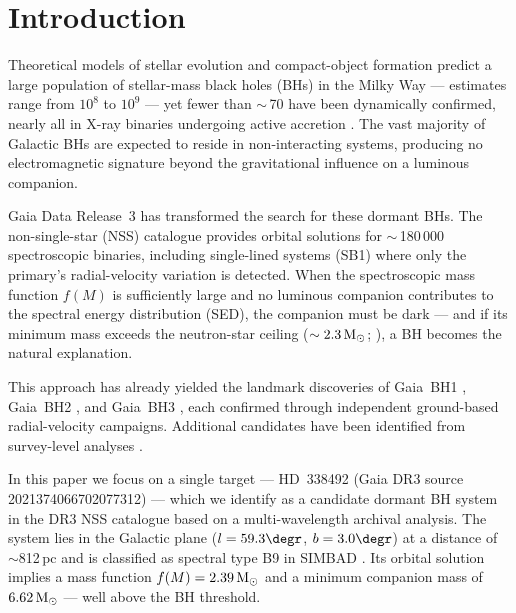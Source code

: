 \documentclass[usenatbib,fleqn]{mnras}
\newcommand{\Msun}{{\rm M}_\odot}
\newcommand{\fmass}{f(M)}
\begin{document}
\section{Introduction}
\label{sec:intro}

Theoretical models of stellar evolution and compact-object formation
predict a large population of stellar-mass black holes (BHs) in the
Milky Way --- estimates range from $10^8$ to $10^9$
\citep{AgolKamionkowski2002, Shapiro1983} --- yet fewer than
$\sim$\,70 have been dynamically confirmed, nearly all in X-ray
binaries undergoing active accretion
\citep{RemillardMcClintock2006}.  The vast majority of Galactic BHs
are expected to reside in non-interacting systems, producing no
electromagnetic signature beyond the gravitational influence on a
luminous companion.

Gaia Data Release~3 \citep[DR3;][]{GaiaCollaboration2023} has
transformed the search for these dormant BHs.  The non-single-star
(NSS) catalogue \citep{GaiaNSS2023} provides orbital solutions for
$\sim$\,180\,000 spectroscopic binaries, including single-lined
systems (SB1) where only the primary's radial-velocity variation is
detected.  When the spectroscopic mass function $\fmass$ is
sufficiently large and no luminous companion contributes to the
spectral energy distribution (SED), the companion must be dark ---
and if its minimum mass exceeds the neutron-star ceiling
($\sim 2.3\,\Msun$; \citealt{Rezzolla2018}), a BH becomes the
natural explanation.

This approach has already yielded the landmark discoveries of
Gaia~BH1 \citep{ElBadry2023a}, Gaia~BH2 \citep{ElBadry2023b}, and
Gaia~BH3 \citep{GaiaBH3_2024}, each confirmed through independent
ground-based radial-velocity campaigns.  Additional candidates have
been identified from survey-level analyses
\citep{Jayasinghe2021, Thompson2019, Shenar2022, Mahy2022}.

In this paper we focus on a single target --- HD~338492 (Gaia DR3
source 2021374066702077312) --- which we identify as a candidate
dormant BH system in the DR3 NSS catalogue
based on a multi-wavelength archival analysis.  The
system lies in the Galactic plane ($l = 59.3\degr$, $b = 3.0\degr$)
at a distance of $\sim$812\,pc and is classified as spectral type
B9 in SIMBAD \citep{Wenger2000}.  Its orbital solution implies a
mass function $\fmass = 2.39\,\Msun$ and a minimum companion mass of
$6.62\,\Msun$ --- well above the BH threshold.
\end{document}
